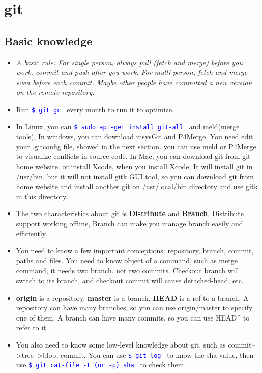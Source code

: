 \documentclass[a4paper,11pt,twoside]{book}
\newcommand{\linuxcommand}[1]{\texttt{\textcolor{blue}{\$ #1 \Pisymbol{psy}{191}}}}
\begin{document}
\section{git}

\subsection{Basic knowledge}
\begin{itemize}
    \item \emph{A basic rule:  For single person, always pull (fetch and merge) before you work,  commit and push after you work.  For multi person, fetch and merge even before each commit.  Maybe other people have committed a new version on the remote repository. }

    \item Run \linuxcommand{git gc} every month to run it to optimize.

    \item In Linux, you can \linuxcommand{sudo apt-get install git-all} and meld(merge tools), In windows, you can download msysGit and P4Merge. You need edit your .gitconfig file, showed in the next section. you can use meld or P4Merge to visualize conflicts in source code. In Mac, you can download git from git home website. or install Xcode, when you install Xcode, It will install git in /usr/bin. but it will not install gitk GUI tool, so you can download git from home website and install another git on /usr/local/bin directory and use gitk in this directory. 

\item The two characteristics about git is \textbf{Distribute} and \textbf{Branch}, Distribute support working offline, Branch can make you manage branch easily and efficiently.

\item You need to know a few important conceptions: repository, branch, commit, paths and files. You need to know object of a command, such as merge command, it needs two branch. not two commits. Checkout branch will switch to its branch, and checkout commit will cause detached-head, etc.  
   
\item \textbf{origin} is a repository, \textbf{master} is a branch, \textbf{HEAD} is a ref to a branch. A repository can have many branches, so you can use origin/master to specify one of them. A branch can have many commits, so you can use HEAD\^{} to refer to it.
    
\item You also need to know some low-level knowledge about git. such as commit-->tree-->blob,  commit. You can use \linuxcommand{git log} to know the sha value, then use \linuxcommand{git cat-file -t (or -p) sha} to check them. 
    

\end{itemize}
\end{document}
